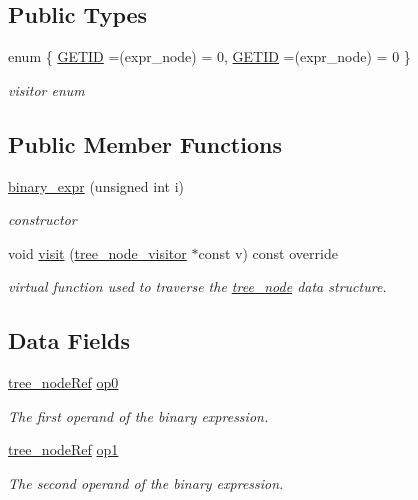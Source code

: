 \subsection*{Public Types}
\begin{DoxyCompactItemize}
\item 
enum \{ \hyperlink{structbinary__expr_ae3c6b9e3fe6c04e0a87243c7ac3cff09aa82e7a81bd257ea6b0ed1e39994ffee8}{G\+E\+T\+ID} =(expr\+\_\+node) = 0, 
\hyperlink{structbinary__expr_ae3c6b9e3fe6c04e0a87243c7ac3cff09aa82e7a81bd257ea6b0ed1e39994ffee8}{G\+E\+T\+ID} =(expr\+\_\+node) = 0
 \}\begin{DoxyCompactList}\small\item\em visitor enum \end{DoxyCompactList}
\end{DoxyCompactItemize}
\subsection*{Public Member Functions}
\begin{DoxyCompactItemize}
\item 
\hyperlink{structbinary__expr_ac4ccf0e5d5c6edf00ce268c41b04038f}{binary\+\_\+expr} (unsigned int i)
\begin{DoxyCompactList}\small\item\em constructor \end{DoxyCompactList}\item 
void \hyperlink{structbinary__expr_a01572c9c6e0d6bee6dadbb1a074cd075}{visit} (\hyperlink{classtree__node__visitor}{tree\+\_\+node\+\_\+visitor} $\ast$const v) const override
\begin{DoxyCompactList}\small\item\em virtual function used to traverse the \hyperlink{classtree__node}{tree\+\_\+node} data structure. \end{DoxyCompactList}\end{DoxyCompactItemize}
\subsection*{Data Fields}
\begin{DoxyCompactItemize}
\item 
\hyperlink{tree__node_8hpp_a6ee377554d1c4871ad66a337eaa67fd5}{tree\+\_\+node\+Ref} \hyperlink{structbinary__expr_ab341e7e0ed973ac0f28ea0e27cdc76d2}{op0}
\begin{DoxyCompactList}\small\item\em The first operand of the binary expression. \end{DoxyCompactList}\item 
\hyperlink{tree__node_8hpp_a6ee377554d1c4871ad66a337eaa67fd5}{tree\+\_\+node\+Ref} \hyperlink{structbinary__expr_ad80e58bd41c1f8e5d7c6fc632d27601e}{op1}
\begin{DoxyCompactList}\small\item\em The second operand of the binary expression. \end{DoxyCompactList}\end{DoxyCompactItemize}
